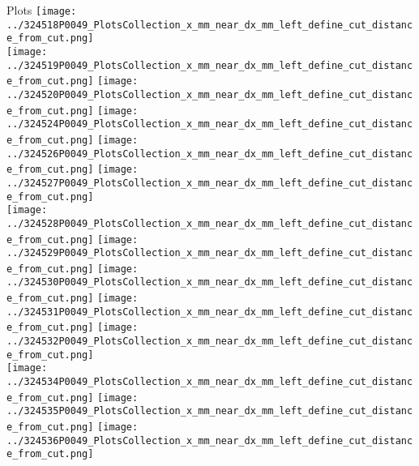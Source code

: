 \documentclass{beamer}
\begin{document}
\begin{frame}
\begin{block}{Plots}
                \texttt{[image: ../324518P0049\_PlotsCollection\_x\_mm\_near\_dx\_mm\_left\_define\_cut\_distance\_from\_cut.png]}\\
                \texttt{[image: ../324519P0049\_PlotsCollection\_x\_mm\_near\_dx\_mm\_left\_define\_cut\_distance\_from\_cut.png]}
                \texttt{[image: ../324520P0049\_PlotsCollection\_x\_mm\_near\_dx\_mm\_left\_define\_cut\_distance\_from\_cut.png]}
                \texttt{[image: ../324524P0049\_PlotsCollection\_x\_mm\_near\_dx\_mm\_left\_define\_cut\_distance\_from\_cut.png]}
                \texttt{[image: ../324526P0049\_PlotsCollection\_x\_mm\_near\_dx\_mm\_left\_define\_cut\_distance\_from\_cut.png]}
                \texttt{[image: ../324527P0049\_PlotsCollection\_x\_mm\_near\_dx\_mm\_left\_define\_cut\_distance\_from\_cut.png]}\\
                \texttt{[image: ../324528P0049\_PlotsCollection\_x\_mm\_near\_dx\_mm\_left\_define\_cut\_distance\_from\_cut.png]}
                \texttt{[image: ../324529P0049\_PlotsCollection\_x\_mm\_near\_dx\_mm\_left\_define\_cut\_distance\_from\_cut.png]}
                \texttt{[image: ../324530P0049\_PlotsCollection\_x\_mm\_near\_dx\_mm\_left\_define\_cut\_distance\_from\_cut.png]}
                \texttt{[image: ../324531P0049\_PlotsCollection\_x\_mm\_near\_dx\_mm\_left\_define\_cut\_distance\_from\_cut.png]}
                \texttt{[image: ../324532P0049\_PlotsCollection\_x\_mm\_near\_dx\_mm\_left\_define\_cut\_distance\_from\_cut.png]}\\
                \texttt{[image: ../324534P0049\_PlotsCollection\_x\_mm\_near\_dx\_mm\_left\_define\_cut\_distance\_from\_cut.png]}
                \texttt{[image: ../324535P0049\_PlotsCollection\_x\_mm\_near\_dx\_mm\_left\_define\_cut\_distance\_from\_cut.png]}
                \texttt{[image: ../324536P0049\_PlotsCollection\_x\_mm\_near\_dx\_mm\_left\_define\_cut\_distance\_from\_cut.png]}

        \end{block}
\end{frame}
\end{document}
